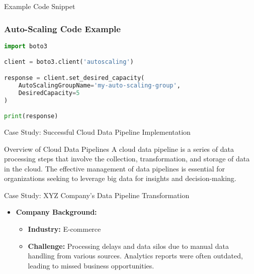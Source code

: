 \documentclass[aspectratio=169]{beamer}
\begin{document}
\begin{frame}[fragile]{Example Code Snippet}
    \frametitle{Auto-Scaling Code Example}
    \begin{lstlisting}[language=Python]
import boto3

client = boto3.client('autoscaling')

response = client.set_desired_capacity(
    AutoScalingGroupName='my-auto-scaling-group',
    DesiredCapacity=5
)

print(response)
    \end{lstlisting}
\end{frame}

\begin{frame}[fragile]{Case Study: Successful Cloud Data Pipeline Implementation}
    \begin{block}{Overview of Cloud Data Pipelines}
        A cloud data pipeline is a series of data processing steps that involve the collection, transformation, and storage of data in the cloud. 
        The effective management of data pipelines is essential for organizations seeking to leverage big data for insights and decision-making.
    \end{block}
\end{frame}

\begin{frame}[fragile]{Case Study: XYZ Company’s Data Pipeline Transformation}
    \begin{itemize}
        \item \textbf{Company Background:}
        \begin{itemize}
            \item \textbf{Industry:} E-commerce
            \item \textbf{Challenge:} Processing delays and data silos due to manual data handling from various sources. Analytics reports were often outdated, leading to missed business opportunities.
        \end{itemize}
    \end{itemize}
\end{frame}
\end{document}
